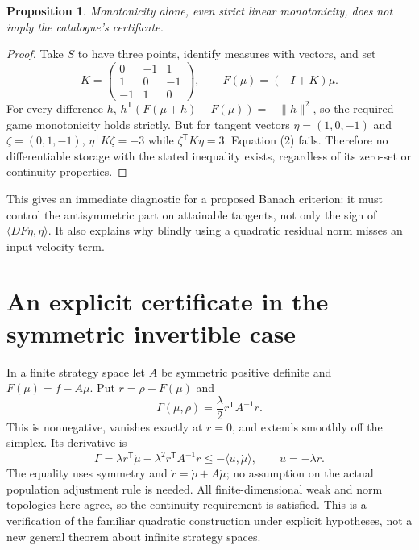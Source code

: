 \documentclass[11pt]{article}
\newtheorem{proposition}{Proposition}
\begin{document}
\begin{proposition}
Monotonicity alone, even strict linear monotonicity, does not imply the catalogue's certificate.
\end{proposition}
\begin{proof}
Take $S$ to have three points, identify measures with vectors, and set
\[
 K=\begin{pmatrix}0&-1&1\\1&0&-1\\-1&1&0\end{pmatrix},
 \qquad F(\mu)=(-I+K)\mu.
\]
For every difference $h$, $h^{\mathsf T}(F(\mu+h)-F(\mu))=-\|h\|^2$, so the required game monotonicity holds strictly. But for tangent vectors $\eta=(1,0,-1)$ and $\zeta=(0,1,-1)$, $\eta^{\mathsf T}K\zeta=-3$ while $\zeta^{\mathsf T}K\eta=3$. Equation (2) fails. Therefore no differentiable storage with the stated inequality exists, regardless of its zero-set or continuity properties.
\end{proof}

This gives an immediate diagnostic for a proposed Banach criterion: it must control the antisymmetric part on attainable tangents, not only the sign of $\langle DF\eta,\eta\rangle$. It also explains why blindly using a quadratic residual norm misses an input-velocity term.

\section*{An explicit certificate in the symmetric invertible case}
In a finite strategy space let $A$ be symmetric positive definite and $F(\mu)=f-A\mu$. Put $r=\rho-F(\mu)$ and
\[
 \Gamma(\mu,\rho)=\frac{\lambda}{2}r^{\mathsf T}A^{-1}r.
\]
This is nonnegative, vanishes exactly at $r=0$, and extends smoothly off the simplex. Its derivative is
\[
 \dot\Gamma=\lambda r^{\mathsf T}\dot\mu
             -\lambda^2r^{\mathsf T}A^{-1}r
 \leq-\langle u,\dot\mu\rangle,
 \qquad u=-\lambda r.
\]
The equality uses symmetry and $\dot r=\dot\rho+A\dot\mu$; no assumption on the actual population adjustment rule is needed. All finite-dimensional weak and norm topologies here agree, so the continuity requirement is satisfied. This is a verification of the familiar quadratic construction under explicit hypotheses, not a new general theorem about infinite strategy spaces.
\end{document}
